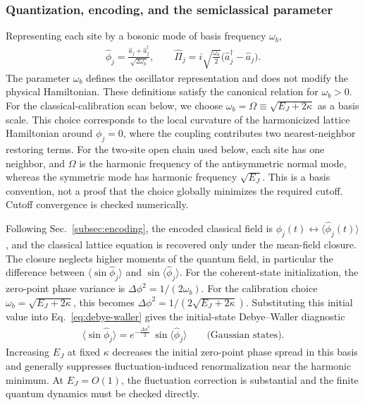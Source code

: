 \documentclass[pra,twocolumn,superscriptaddress,nofootinbib,floatfix]{revtex4-2}
\theoremstyle{remark}
\begin{document}
\subsubsection{Quantization, encoding, and the semiclassical parameter}
\label{subsec:sg-quantization}

Representing each site by a bosonic mode of basis frequency $\omega_b$,
\begin{align}
\hat\phi_j = \tfrac{\hat a_j + \hat a_j^\dagger}{\sqrt{2\omega_b}},\qquad\hat\Pi_j = i\sqrt{\tfrac{\omega_b}{2}}\bigl(\hat a_j^\dagger - \hat a_j\bigr).
\label{eq:sg-quadratures}
\end{align}
The parameter \(\omega_b\) defines the oscillator representation and does not modify the physical Hamiltonian. These definitions satisfy the canonical relation for \(\omega_b>0\). For the classical-calibration scan below, we choose \(\omega_b=\Omega\equiv\sqrt{E_J+2\kappa}\) as a basis scale. This choice corresponds to the local curvature of the harmonicized lattice Hamiltonian around \(\phi_j=0\), where the coupling contributes two nearest-neighbor restoring terms. For the two-site open chain used below, each site has one neighbor, and \(\Omega\) is the harmonic frequency of the antisymmetric normal mode, whereas the symmetric mode has harmonic frequency \(\sqrt{E_J}\). This is a basis convention, not a proof that the choice globally minimizes the required cutoff. Cutoff convergence is checked numerically.

Following Sec.~\ref{subsec:encoding}, the encoded classical field is $\phi_j(t) \leftrightarrow \langle\hat\phi_j(t)\rangle$, and the classical lattice equation is recovered only under the mean-field closure. The closure neglects higher moments of the quantum field, in particular the difference between \(\langle\sin\hat\phi_j\rangle\) and \(\sin\langle\hat\phi_j\rangle\).
For the coherent-state initialization, the zero-point phase variance is
\(\Delta\phi^2 = 1/(2\omega_b).\)
For the calibration choice \(\omega_b=\sqrt{E_J+2\kappa}\), this becomes \(\Delta\phi^2=1/(2\sqrt{E_J+2\kappa})\). Substituting this initial value into Eq.~\eqref{eq:debye-waller} gives the initial-state Debye--Waller diagnostic
\begin{align}
\bigl\langle\sin\hat\phi_j\bigr\rangle= e^{-\tfrac{\Delta\phi^2}{2}}\,\sin\langle\hat\phi_j\rangle\qquad\text{(Gaussian states)}.
\label{eq:sg-dw}
\end{align}
Increasing \(E_J\) at fixed \(\kappa\) decreases the initial zero-point phase spread in this basis and generally suppresses fluctuation-induced renormalization near the harmonic minimum. At \(E_J=O(1)\), the fluctuation correction is substantial and the finite quantum dynamics must be checked directly.
\end{document}

